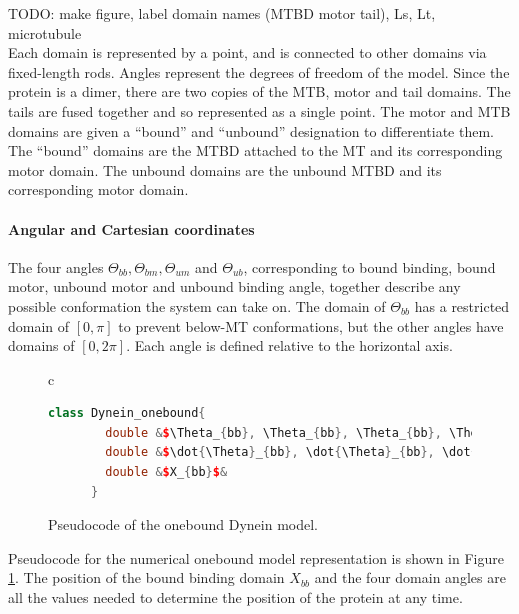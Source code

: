 \documentclass[10pt]{article} %
\begin{document}
TODO: make figure, label domain names (MTBD motor tail), Ls, Lt, microtubule\\

Each domain is represented by a point, and is connected to other domains via fixed-length rods. Angles represent the degrees of freedom of the model. Since the protein is a dimer, there are two copies of the MTB, motor and tail domains. The tails are fused together and so represented as a single point. The motor and MTB domains are given a ``bound'' and ``unbound'' designation to differentiate them. The ``bound'' domains are the MTBD attached to the MT and its corresponding motor domain. The unbound domains are the unbound MTBD and its corresponding motor domain.\\

\paragraph{Angular and Cartesian coordinates}

The four angles $\Theta_{bb}, \Theta_{bm}, \Theta_{um}$ and $\Theta_{ub}$, corresponding to bound binding, bound motor, unbound motor and unbound binding angle, together describe any possible conformation the system can take on. The domain of $\Theta_{bb}$ has a restricted domain of $[0,\pi]$ to prevent below-MT conformations, but the other angles have domains of $[0,2\pi]$. Each angle is defined relative to the horizontal axis.\\

\begin{figure}[h]
  \centering
  \begin{tabular}{c}
    \begin{lstlisting}[language=C++]
      class Dynein_onebound{
        double &$\Theta_{bb}, \Theta_{bb}, \Theta_{bb}, \Theta_{bb}$&
        double &$\dot{\Theta}_{bb}, \dot{\Theta}_{bb}, \dot{\Theta}_{bb}, \dot{\Theta}_{bb}$&
        double &$X_{bb}$&
      }
    \end{lstlisting}
  \end{tabular}
  \caption{Pseudocode of the onebound Dynein model.}
  \label{ob_struct}
\end{figure}

Pseudocode for the numerical onebound model representation is shown in Figure \ref{ob_struct}. The position of the bound binding domain $X_{bb}$ and the four domain angles are all the values needed to determine the position of the protein at any time.\\
\end{document}
